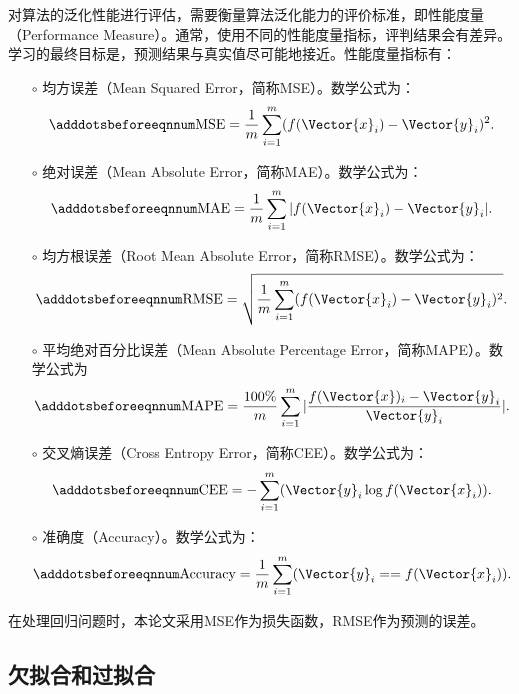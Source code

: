 对算法的泛化性能进行评估，需要衡量算法泛化能力的评价标准，即性能度量（Performance Measure）。通常，使用不同的性能度量指标，评判结果会有差异。学习的最终目标是，预测结果与真实值尽可能地接近。性能度量指标有：
\begin{enumerate}
  \item[$\circ$] 均方误差（Mean Squared Error，简称MSE）。数学公式为：
  \begin{equation}\adddotsbeforeeqnnum
    \label{eq:ml_mse}
    \text{MSE}=\frac{1}{m}\sum_{i=1}^{m}(f(\Vector{x}_i)-\Vector{y}_i)^2.
  \end{equation}
  \item[$\circ$] 绝对误差（Mean Absolute Error，简称MAE）。数学公式为：
  \begin{equation}\adddotsbeforeeqnnum
    \label{eq:ml_mae}
    \text{MAE}=\frac{1}{m}\sum_{i=1}^{m}|f(\Vector{x}_i)-\Vector{y}_i|.
  \end{equation}
  \item[$\circ$] 均方根误差（Root Mean Absolute Error，简称RMSE）。数学公式为：
  \begin{equation}\adddotsbeforeeqnnum
    \label{eq:ml_rmse}
    \text{RMSE}=\sqrt{\frac{1}{m}\sum_{i=1}^{m}(f(\Vector{x}_i)-\Vector{y}_i)^2}.
  \end{equation}
  \item[$\circ$] 平均绝对百分比误差（Mean Absolute Percentage Error，简称MAPE）。数学公式为
  \begin{equation}\adddotsbeforeeqnnum
    \label{eq:ml_mape}
    \text{MAPE}=\frac{100\%}{m}\sum_{i=1}^{m}|\frac{f(\Vector{x})_i-\Vector{y}_i}{\Vector{y}_i}|.
  \end{equation}
  \item[$\circ$] 交叉熵误差（Cross Entropy Error，简称CEE）。数学公式为：
  \begin{equation}\adddotsbeforeeqnnum
    \label{eq:ml_cee}
    \text{CEE}=-\sum_{i=1}^{m}(\Vector{y}_i\log f(\Vector{x}_i)).
  \end{equation}
  \item[$\circ$] 准确度（Accuracy）。数学公式为：
  \begin{equation}\adddotsbeforeeqnnum
    \label{eq:ml_acc}
    \text{Accuracy}=\frac{1}{m}\sum_{i=1}^{m}(\Vector{y}_i == f(\Vector{x}_i)).
  \end{equation}
\end{enumerate}
在处理回归问题时，本论文采用MSE作为损失函数，RMSE作为预测的误差。

\subsection{欠拟合和过拟合}\label{sec:ml_fitting}

